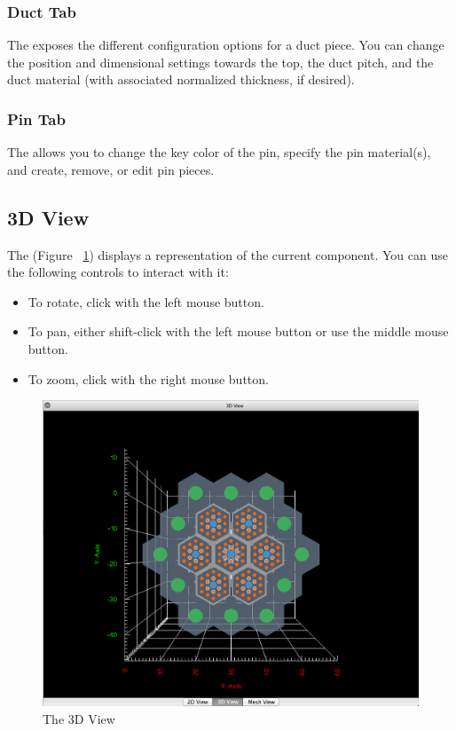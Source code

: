 \subsubsection{Duct Tab}
The  exposes the different configuration options for a duct piece.  You can change the position and dimensional settings towards the top, the duct pitch, and the duct material (with associated normalized thickness, if desired).

\subsubsection{Pin Tab}
The  allows you to change the key color of the pin, specify the pin material(s), and create, remove, or edit pin pieces.

\subsection{3D View}
The  (Figure ~\ref{fig:3DView}) displays a representation of the current component.  You can use the following controls to interact with it:
\begin{itemize}
	\item{To rotate, click with the left mouse button.}
	\item{To pan, either shift-click with the left mouse button or use the middle mouse button.}
	\item{To zoom, click with the right mouse button.}
\end{itemize}

\begin{figure}
	\begin{center}
		\includegraphics[width=0.9\linewidth]{Images/3DView.png}
		\caption{The 3D View}
		\label{fig:3DView}
	\end{center}
	\vspace{-40pt}
\end{figure}

